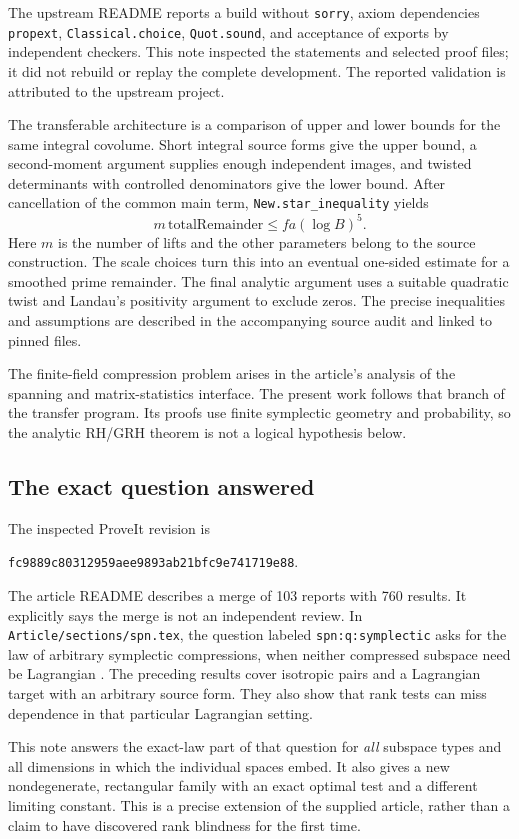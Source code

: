 \documentclass[11pt]{article}
\numberwithin{equation}{section}
\theoremstyle{definition}
\theoremstyle{remark}
\newcommand{\code}[1]{\nolinkurl{#1}}
\newcommand{\articlecommit}{\texttt{fc9889c80312959aee9893ab21bfc9e741719e88}}
\begin{document}
The upstream README reports a build without \code{sorry}, axiom dependencies
\code{propext}, \code{Classical.choice}, \code{Quot.sound}, and acceptance of exports by independent checkers. This note inspected the statements and selected proof files; it did not rebuild or replay the complete development. The reported validation is attributed to the upstream project.

The transferable architecture is a comparison of upper and lower bounds for the same integral covolume. Short integral source forms give the upper bound, a second-moment argument supplies enough independent images, and twisted determinants with controlled denominators give the lower bound. After cancellation of the common main term, \code{New.star_inequality} yields
\[
 m\,\mathrm{totalRemainder}\le f a(\log B)^5.
\]
Here $m$ is the number of lifts and the other parameters belong to the source construction. The scale choices turn this into an eventual one-sided estimate for a smoothed prime remainder. The final analytic argument uses a suitable quadratic twist and Landau's positivity argument to exclude zeros. The precise inequalities and assumptions are described in the accompanying source audit and linked to pinned files.

The finite-field compression problem arises in the article's analysis of the spanning and matrix-statistics interface. The present work follows that branch of the transfer program. Its proofs use finite symplectic geometry and probability, so the analytic RH/GRH theorem is not a logical hypothesis below.

\subsection{The exact question answered}
The inspected ProveIt revision is
\begin{center}\articlecommit.\end{center}
The article README describes a merge of 103 reports with 760 results. It explicitly says the merge is not an independent review. In \code{Article/sections/spn.tex}, the question labeled \code{spn:q:symplectic} asks for the law of arbitrary symplectic compressions, when neither compressed subspace need be Lagrangian \cite{article}. The preceding results cover isotropic pairs and a Lagrangian target with an arbitrary source form. They also show that rank tests can miss dependence in that particular Lagrangian setting.

This note answers the exact-law part of that question for \emph{all} subspace types and all dimensions in which the individual spaces embed. It also gives a new nondegenerate, rectangular family with an exact optimal test and a different limiting constant. This is a precise extension of the supplied article, rather than a claim to have discovered rank blindness for the first time.
\end{document}
